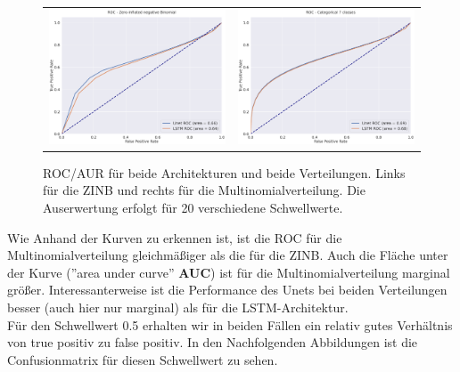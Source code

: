 \begin{figure}[h]
\begin{tabular}{cc}
\includegraphics[width=70mm]{abb/ROC_ZINFBINOM.png}&
\includegraphics[width=70mm]{abb/ROC_Categorical.png}
\end{tabular}
\caption{ROC/AUR für beide Architekturen und beide Verteilungen. Links für die ZINB und rechts für die Multinomialverteilung.
Die Auserwertung erfolgt für 20 verschiedene Schwellwerte. \label{fig:anomerz}}
\end{figure}

\noindent Wie Anhand der Kurven zu erkennen ist, ist die ROC für die Multinomialverteilung gleichmäßiger als die für die ZINB. 
Auch die Fläche unter der Kurve (''area under curve'' \textbf{AUC}) ist für die Multinomialverteilung marginal größer. Interessanterweise ist die Performance des Unets bei beiden Verteilungen besser (auch hier nur marginal) als für die LSTM-Architektur.\\

\noindent Für den Schwellwert 0.5 erhalten wir in beiden Fällen ein relativ gutes Verhältnis von true positiv zu false positiv. In den Nachfolgenden Abbildungen ist die Confusionmatrix für diesen Schwellwert zu sehen.




